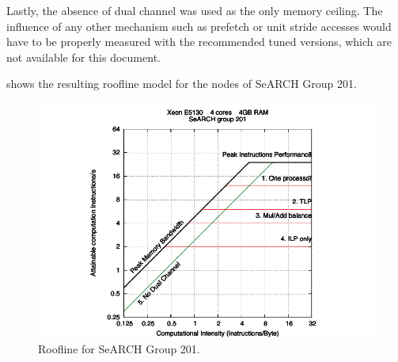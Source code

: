 Lastly, the absence of dual channel was used as the only memory ceiling. The influence of any other mechanism such as prefetch or unit stride accesses would have to be properly measured with the recommended tuned versions, which are not available for this document.

 shows the resulting roofline model for the nodes of SeARCH Group 201.

\begin{figure}[!htp]
	\begin{center}
		\includegraphics[width=\columnwidth]{images/roofline201}
	\end{center}
	\caption{Roofline for SeARCH Group 201.}
	\label{fig:roofline}
\end{figure}
